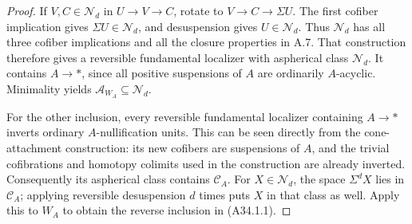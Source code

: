 \begin{proof}
If $V,C\in\mathcal N_d$ in $U\to V\to C$, rotate to
$V\to C\to\Sigma U$.  The first cofiber implication gives
$\Sigma U\in\mathcal N_d$, and desuspension gives
$U\in\mathcal N_d$.  Thus $\mathcal N_d$ has all three cofiber
implications and all the closure properties in A.7.  That construction
therefore gives a reversible fundamental localizer with aspherical
class $\mathcal N_d$.  It contains $A\to *$, since all positive
suspensions of $A$ are ordinarily $A$-acyclic.  Minimality yields
$\mathcal A_{W_A}\subseteq\mathcal N_d$.

For the other inclusion, every reversible fundamental localizer
containing $A\to *$ inverts ordinary $A$-nullification units.  This
can be seen directly from the cone-attachment construction: its new
cofibers are suspensions of $A$, and the trivial cofibrations and
homotopy colimits used in the construction are already inverted.
Consequently its aspherical class contains $\mathcal C_A$.
For $X\in\mathcal N_d$, the space $\Sigma^dX$ lies in
$\mathcal C_A$; applying reversible desuspension $d$ times puts $X$
in that class as well.  Apply this to $W_A$ to obtain the reverse
inclusion in \textup{(A34.1.1)}.
\end{proof}

